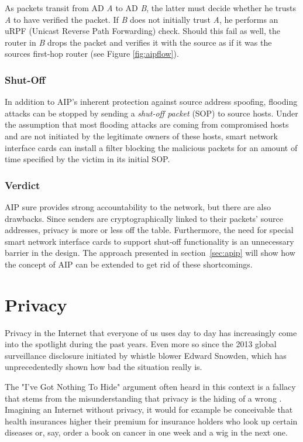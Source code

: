 \documentclass{acm_proc_article-sp}
\begin{document}
As packets transit from AD \emph{A} to AD \emph{B}, the latter must decide whether he trusts \emph{A} to have verified the packet. If \emph{B} does not initially trust \emph{A}, he performs an uRPF (Unicast Reverse Path Forwarding) check. Should this fail as well, the router in \emph{B} drops the packet and verifies it with the source as if it was the sources first-hop router (see Figure \ref{fig:aipflow}).

\subsubsection{Shut-Off}
In addition to AIP's inherent protection against source address spoofing, flooding attacks can be stopped by sending a \emph{shut-off packet} (SOP) to source hosts. Under the assumption that most flooding attacks are coming from compromised hosts and are not initiated by the legitimate owners of these hosts, smart network interface cards can install a filter blocking the malicious packets for an amount of time specified by the victim in its initial SOP.

\subsubsection{Verdict}
AIP sure provides strong accountability to the network, but there are also drawbacks. Since senders are cryptographically linked to their packets' source addresses, privacy is more or less off the table. Furthermore, the need for special smart network interface cards to support shut-off functionality is an unnecessary barrier in the design. The approach presented in section~\ref{sec:apip} will show how the concept of AIP can be extended to get rid of these shortcomings.


\section{Privacy}
\label{sec:priv}
Privacy in the Internet that everyone of us uses day to day has increasingly come into the spotlight during the past years. Even more so since the 2013 global surveillance disclosure initiated by whistle blower Edward Snowden, which has unprecedentedly shown how bad the situation really is.

The "I've Got Nothing To Hide" argument often heard in this context is a fallacy that stems from the misunderstanding that privacy is the hiding of a wrong \cite{solove}. Imagining an Internet without privacy, it would for example be conceivable that health insurances higher their premium for insurance holders who look up certain diseases or, say, order a book on cancer in one week and a wig in the next one.
\end{document}
